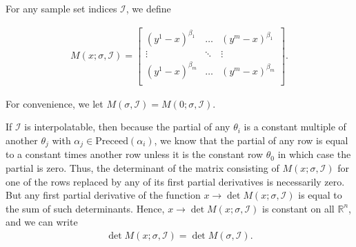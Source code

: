 \documentclass{article}
\theoremstyle{case}
\newcommand{\Rn}{\mathbb R^n}
\newcommand{\preceed}{{\textrm{Preceed}}}
\newcommand{\bidx}{{\mathcal I}}
\begin{document}
For any sample set indices $\bidx$, we define

\begin{align}
M(x; \sigma, \bidx) = \begin{bmatrix}
\left(y^1 - x\right)^{\beta_1} & \ldots & \left(y^m - x\right)^{\beta_1} \\
\vdots &\ddots & \vdots\\
\left(y^1 - x\right)^{\beta_m} & \ldots & \left(y^m - x\right)^{\beta_m} \\
\end{bmatrix}. \label{define_m}
\end{align}





For convenience, we let $M(\sigma, \bidx) = M(0; \sigma, \bidx)$.

If $\bidx$ is interpolatable, then because the partial of any $\theta_i$ is a constant multiple of another $\theta_j$ with $\alpha_j \in \preceed(\alpha_i)$,
we know that the partial of any row is equal to a constant times another row unless it is the constant row $\theta_0$ in which case the partial is zero.
Thus, the determinant of the matrix consisting of $M(x; \sigma, \bidx)$ for one of the rows replaced by any of its first partial derivatives is necessarily zero.
But any first partial derivative of the function $x \to \det M(x; \sigma, \bidx)$ is equal to the sum of such determinants.
Hence, $x \to \det M(x; \sigma, \bidx)$ is constant on all $\Rn$, and we can write
\begin{align*}
\det M(x; \sigma, \bidx) = \det M(\sigma, \bidx).
\end{align*}
\end{document}
